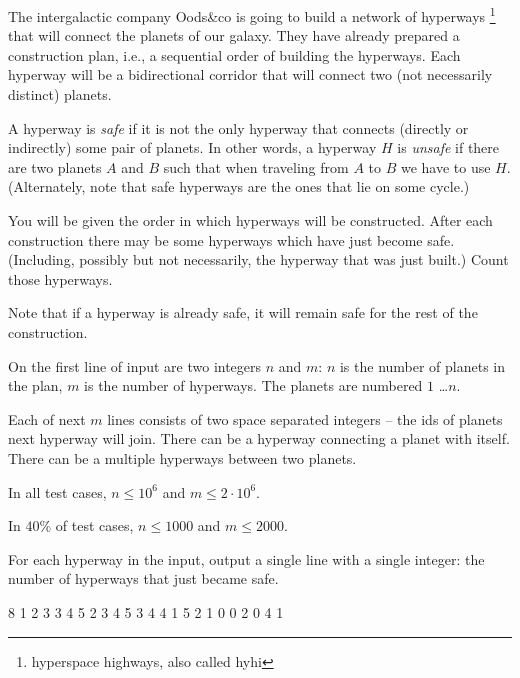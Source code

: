





The intergalactic company Oods\&co is going to build a network of hyperways%
\footnote{hyperspace highways, also called hyhi}
that will connect the planets of our galaxy.
They have already prepared a construction plan,
i.e., a sequential order of building the hyperways.
Each hyperway will be a bidirectional corridor that will connect two (not necessarily distinct) planets.


A hyperway is \emph{safe} if it is not the only hyperway that connects (directly or indirectly)
some pair of planets. In other words, a hyperway $H$ is \emph{unsafe} if there are two planets
$A$ and $B$ such that when traveling from $A$ to $B$ we have to use $H$. (Alternately, note that safe 
hyperways are the ones that lie on some cycle.)

You will be given the order in which hyperways will be constructed.
After each construction there may be some hyperways which have just become safe.
(Including, possibly but not necessarily, the hyperway that was just built.)
Count those hyperways.

Note that if a hyperway is already safe, it will remain safe for the rest of the construction.


On the first line of input are two integers $n$ and $m$:
$n$ is the number of planets in the plan,
$m$ is the number of hyperways.
The planets are numbered $1$ \dots $n$.

Each of next $m$ lines consists
of two space separated integers --
the ids of planets next hyperway will join.
There can be a hyperway connecting a planet with itself.
There can be a multiple hyperways between two planets.

\smallskip

In all test cases, $n \leq 10^6$ and $m \leq 2\cdot10^6$.

In $40\%$ of test cases, $n \leq 1000$ and $m \leq 2000$.


For each hyperway in the input, output a single line with a single integer:
the number of hyperways that just became safe.



 8
1 2
3 3
4 5
2 3
4 5
3 4
4 1
5 2
1
0
0
2
0
4
1
\sampleEND



